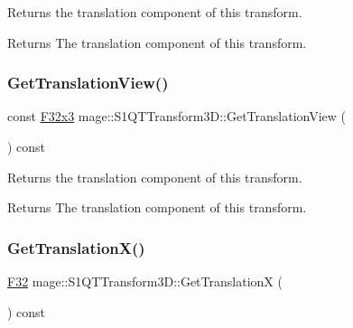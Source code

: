 Returns the translation component of this transform.

\begin{DoxyReturn}{Returns}
The translation component of this transform. 
\end{DoxyReturn}
\mbox{\label{classmage_1_1_s1_q_t_transform3_d_a76ffd5916fe986477c4a02a346cc2363}} 
\subsubsection{\texorpdfstring{Get\+Translation\+View()}{GetTranslationView()}}
{\footnotesize\ttfamily const \mbox{\hyperlink{namespacemage_a1e3c7a882af461f161caa1cbddaf1fa2}{F32x3}} mage\+::\+S1\+Q\+T\+Transform3\+D\+::\+Get\+Translation\+View (\begin{DoxyParamCaption}{ }\end{DoxyParamCaption}) const\hspace{0.3cm}{\ttfamily [noexcept]}}

Returns the translation component of this transform.

\begin{DoxyReturn}{Returns}
The translation component of this transform. 
\end{DoxyReturn}
\mbox{\label{classmage_1_1_s1_q_t_transform3_d_a369ee13f9132ca21bfaceadb61794877}} 
\subsubsection{\texorpdfstring{Get\+Translation\+X()}{GetTranslationX()}}
{\footnotesize\ttfamily \mbox{\hyperlink{namespacemage_aa97e833b45f06d60a0a9c4fc22ae02c0}{F32}} mage\+::\+S1\+Q\+T\+Transform3\+D\+::\+Get\+TranslationX (\begin{DoxyParamCaption}{ }\end{DoxyParamCaption}) const\hspace{0.3cm}{\ttfamily [noexcept]}}

